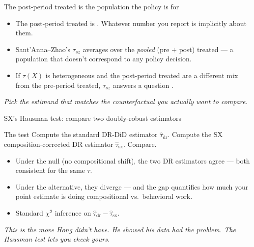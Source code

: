 \documentclass[aspectratio=169,11pt]{beamer}
\begin{document}
\begin{frame}{The post-period treated is the population the policy is for}
\vspace{0.4em}
\vspace{0.4em}
\begin{itemize}\small
  \item The post-period treated is . Whatever number you report is implicitly about them.
  \item Sant'Anna--Zhao's $\tau_{sz}$ averages over the \textit{pooled} (pre $+$ post) treated --- a population that doesn't correspond to any policy decision.
  \item If $\tau(X)$ is heterogeneous and the post-period treated are a different mix from the pre-period treated, $\tau_{sz}$ answers a question .
\end{itemize}
\vspace{0.3em}
\begin{center}
\small\color{warmgray}\itshape
Pick the estimand that matches the counterfactual you actually want to compare.
\end{center}
\end{frame}

\begin{frame}{SX's Hausman test: compare two doubly-robust estimators}
\vspace{0.5em}
\begin{block}{The test}
\small
Compute the standard DR-DiD estimator $\widehat\tau_{\text{dr}}$. \;Compute the SX composition-corrected DR estimator $\widehat\tau_{\text{sx}}$. \;Compare.
\end{block}
\vspace{0.5em}
\begin{itemize}\small
  \item Under the null (no compositional shift), the two DR estimators agree --- both consistent for the same $\tau$.
  \item Under the alternative, they diverge --- and the gap quantifies how much your point estimate is doing compositional vs.\ behavioral work.
  \item Standard $\chi^2$ inference on $\widehat\tau_{\text{dr}} - \widehat\tau_{\text{sx}}$.
\end{itemize}
\vspace{0.3em}
\begin{center}
\small\color{warmgray}\itshape
This is the move Hong didn't have. \;He showed \textit{his} data had the problem. \;The Hausman test lets \textit{you} check yours.
\end{center}
\end{frame}
\end{document}
